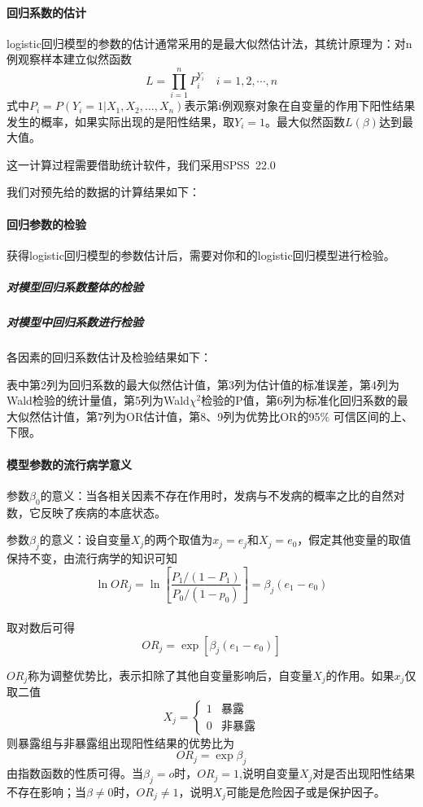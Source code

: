 \documentclass[bwprint]{cumcmthesis}
\begin{document}
\paragraph{回归系数的估计}
logistic回归模型的参数的估计通常采用的是最大似然估计法，其统计原理为：对n例观察样本建立似然函数\[ L=\prod_{i=1}^{n}P_{i}^{Y_{i}}\quad i=1,2,\cdots,n \]
式中$ P_{i} =P(Y_{i}=1|X_{1},X_{2},\ldots,X_{n})$表示第i例观察对象在自变量的作用下阳性结果发生的概率，如果实际出现的是阳性结果，取$ Y_{i}=1 $。最大似然函数$ L(\beta) $达到最大值。

这一计算过程需要借助统计软件，我们采用SPSS~22.0

我们对预先给的数据的计算结果如下：

\paragraph{回归参数的检验}
获得logistic回归模型的参数估计后，需要对你和的logistic回归模型进行检验。
\subparagraph{对模型回归系数整体的检验}
\subparagraph{对模型中回归系数进行检验}
各因素的回归系数估计及检验结果如下：

表中第2列为回归系数的最大似然估计值，第3列为估计值的标准误差，第4列为Wald检验的统计量值，第5列为Wald$ \chi^{2} $检验的P值，第6列为标准化回归系数的最大似然估计值，第7列为OR估计值，第8、9列为优势比OR的95\% 可信区间的上、下限。

\paragraph{模型参数的流行病学意义}
参数$ \beta_{0} $的意义：当各相关因素不存在作用时，发病与不发病的概率之比的自然对数，它反映了疾病的本底状态。

参数$ \beta_{j} $的意义：设自变量$ X_{j} $的两个取值为$ x_{j}=e_{j} $和$ X_{j}=e_{0} $，假定其他变量的取值保持不变，由流行病学的知识可知
\[ \ln OR_{j}=\ln[\dfrac{P_{1}/(1-P_{1})}{P_{0}/(1-p_{0})}]=\beta_{j}(e_{1}-e_{0}) \]\\
取对数后可得
\begin{equation}
OR_{j}=\exp [\beta_{j}(e_{1}-e_{0})]
\end{equation}

$ OR_{j} $称为调整优势比，表示扣除了其他自变量影响后，自变量$ X_{j} $的作用。如果$ x_{j} $仅取二值
\[ X_{j}=\begin{cases}
1 & \text{暴露}\\
0 & \text{非暴露}
\end{cases} \]
则暴露组与非暴露组出现阳性结果的优势比为
\begin{equation}
OR_{j}=\exp\beta_{j} 
\end{equation}
由指数函数的性质可得。当$ \beta_{j}=o $时，$ OR_{j}=1 $,说明自变量$ X_{j} $对是否出现阳性结果不存在影响；当$ \beta\neq0 $时，$ OR_{j}\neq1 $，说明$ X_{j} $可能是危险因子或是保护因子。
\end{document}
